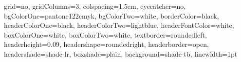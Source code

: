 \documentclass[portrait,final]{baposter} %
\begin{document}
\newlength{\leftimgwidth}

\begin{poster}%
  {
    grid=no,                            %
    gridColumns=3,                      %
    colspacing=1.5em,                   %
    eyecatcher=no,                      %
    bgColorOne=pantone122cmyk,                   %
    bgColorTwo=white,          %
    borderColor=black,              %
    headerColorOne=black,               %
    headerColorTwo=lightblue,           %
    headerFontColor=white,              %
    boxColorOne=white,                  %
    boxColorTwo=white,                  %
    textborder=roundedleft,             %
    headerheight=0.09\textheight,      %
    headershape=roundedright,           %
    headerborder=open,                  %
    headershade=shade-lr,               %
    boxshade=plain,                     %
    background=shade-tb,                %
    linewidth=1pt                       %
  }
  {
    \postereyecatcher
  }
  {
    \postertitle
  }
  {
    \posterauthor
  }%


  

\end{poster}%
\end{document}
